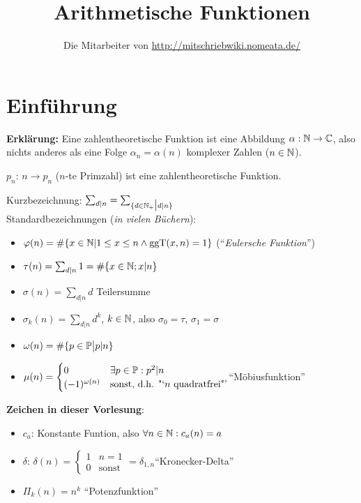 \documentclass[a4paper,DIV15,BCOR12mm]{article}
\author{Die Mitarbeiter von \url{http://mitschriebwiki.nomeata.de/}}
\title{Arithmetische Funktionen}
\begin{document}
\maketitle

\section{Einführung}
\textbf{Erklärung:} Eine zahlentheoretische Funktion ist eine Abbildung $\alpha: \mathbb{N} \to \mathbb{C}$, also nichts anderes als eine Folge $\alpha_n  = \alpha(n)$ komplexer Zahlen ($n \in \mathbb{N}$).\\

\begin{beispiel}
$p_n$: $n \to p_n$ ($n$-te Primzahl)  ist eine zahlentheoretische
Funktion.
\end{beispiel}

Kurzbezeichnung: $\sum_{d|n} = \sum_{\{d \in \mathbb{N}_+ \big| d|n\}}$\\
Standardbezeichnungen (\emph{in vielen Büchern}):
\begin{itemize}
    \item $\varphi(n) = \#\{x \in \mathbb{N} | 1 \le x \le n \wedge \mathop{\rm ggT}\nolimits(x,n) = 1\}$ ("`\emph{Eulersche Funktion}"')
    \item $\tau(n) = \sum_{d|n}1 = \#\{x \in \mathbb{N} ; x|n\}$
    \item $\sigma(n) = \sum_{d|n}d $ \glqq{}Teilersumme\grqq
    \item $\sigma_k(n) = \sum_{d|n}d^k$, $k\in\mathbb{N}$, also $\sigma_0 = \tau$, $\sigma_1=\sigma$
    \item $\omega(n) = \#\{p\in\mathbb{P}\big|p|n\}$
    \item $\mu(n) =
\begin{cases}
0 & \exists p\in\mathbb{P} : p^2|n \\
(-1)^{\omega(n)} & \text{sonst, d.h. "`$n$ quadratfrei"'}
\end{cases}$\quad\quad "`Möbiusfunktion"'
\end{itemize}

\textbf{Zeichen in dieser Vorlesung}:
\begin{itemize}
\item $c_a$: Konstante Funtion, also $\forall n\in\mathbb{N}: c_a(n) = a$
\item $\delta$: $\delta(n) =
\begin{cases}
1 & n=1 \\
0 & \text{sonst}
\end{cases} = \delta_{1,n}$\quad "`Kronecker-Delta"'
\item $\Pi_k(n) = n^k$ "`Potenzfunktion"'
\end{itemize}
\end{document}
